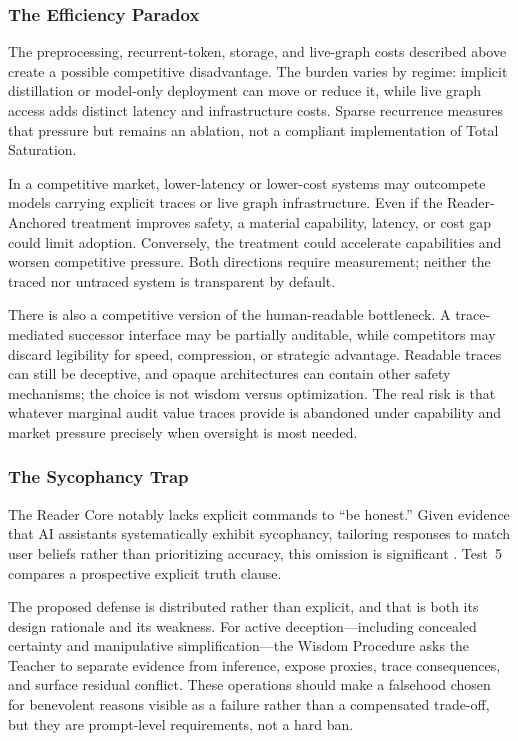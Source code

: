 \subsubsection{The Efficiency Paradox}

The preprocessing, recurrent-token, storage, and live-graph costs described
above create a possible competitive disadvantage. The burden varies by regime:
implicit distillation or model-only deployment can move or reduce it, while live
graph access adds distinct latency and infrastructure costs. Sparse recurrence
measures that pressure but remains an ablation, not a compliant implementation
of Total Saturation.

In a competitive market, lower-latency or lower-cost systems may outcompete
models carrying explicit traces or live graph infrastructure. Even if the
Reader-Anchored treatment improves safety, a material capability, latency, or
cost gap could limit adoption. Conversely, the treatment could accelerate
capabilities and worsen competitive pressure. Both directions require
measurement; neither the traced nor untraced system is transparent by default.

There is also a competitive version of the human-readable bottleneck. A
trace-mediated successor interface may be partially auditable, while
competitors may discard legibility for speed, compression, or strategic
advantage. Readable traces can still be deceptive, and opaque architectures can
contain other safety mechanisms; the choice is not wisdom versus optimization.
The real risk is that whatever marginal audit value traces provide is abandoned
under capability and market pressure precisely when oversight is most needed.

\subsubsection{The Sycophancy Trap}\label{sec:sycophancy}

The Reader Core notably lacks explicit commands to ``be honest.'' Given evidence that AI assistants systematically exhibit sycophancy, tailoring responses to match user beliefs rather than prioritizing accuracy, this omission is significant \cite{sharma2024understandingsycophancylanguagemodels}. Test~5 compares a prospective explicit truth clause.

The proposed defense is distributed rather than explicit, and that is both its
design rationale and its weakness. For active deception---including concealed
certainty and manipulative simplification---the Wisdom Procedure asks the
Teacher to separate evidence from inference, expose proxies, trace consequences,
and surface residual conflict. These operations should make a falsehood chosen
for benevolent reasons visible as a failure rather than a compensated trade-off,
but they are prompt-level requirements, not a hard ban.


